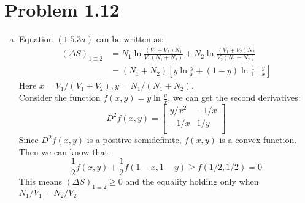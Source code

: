 \documentclass{article}
\begin{document}
\section*{Problem 1.12}

    \begin{enumerate}[(a)]
        \item   Equation $(1.5.3a)$ can be written as: 
                \begin{equation}
                \begin{aligned}
                    \left(\Delta S \right)_{1\equiv 2}&=N_1\ln \frac{(V_1+V_2)N_1}{V_1(N_1+N_2)}+N_2\ln \frac{(V_1+V_2)N_2}{V_2(N_1+N_2)}\\
                                                    &=(N_1+N_2)\left[y\ln \frac{y}{x}+(1-y)\ln\frac{1-y}{1-x}\right]
                \end{aligned}
                \end{equation}
                Here $x=V_1/(V_1+V_2), y=N_1/(N_1+N_2)$.\\
                
                Consider the function $f(x,y)=y \ln \frac{y}{x}$, we can get the second derivatives:
                \begin{equation}
                    D^2 f(x,y)=\left[
                    \begin{array}{cc}
                        y/x^2 & -1/x \\
                        -1/x & 1/y \\
                    \end{array}\right]
                \end{equation}
                Since $D^2 f(x,y)$ is a positive-semidefinite, $f(x,y)$ is a convex function. Then we can know that:
                \begin{equation}
                    \frac{1}{2} f(x,y)+\frac{1}{2}f(1-x,1-y)\geq f(1/2,1/2)=0
                \end{equation}
                This means $\left(\Delta S \right)_{1\equiv 2}\geq 0$ and the equality holding only when $N_1/V_1=N_2/V_2$
                

\end{enumerate}
\end{document}
